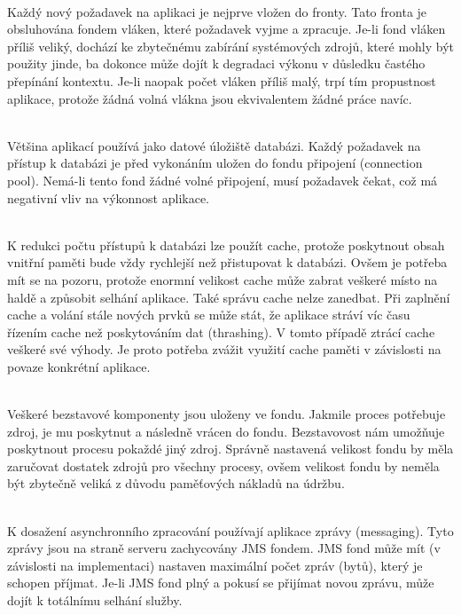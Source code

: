 \documentclass[122pt,oneside]{fithesis}
\begin{document}
\vspace{5 mm}
\\\indent Každý nový požadavek na aplikaci je nejprve vložen do fronty. Tato fronta je obsluhována fondem vláken, které požadavek vyjme a zpracuje. Je-li fond vláken příliš veliký, dochází ke zbytečnému zabírání systémových zdrojů, které mohly být použity jinde, ba dokonce může dojít k degradaci výkonu v důsledku častého přepínání kontextu. Je-li naopak počet vláken příliš malý, trpí tím propustnost aplikace, protože žádná volná vlákna jsou ekvivalentem žádné práce navíc.

\vspace{5 mm}
\\\indent Většina aplikací používá jako datové úložiště databázi. Každý požadavek na přístup k databázi je před vykonáním uložen do fondu připojení (connection pool). Nemá-li tento fond žádné volné připojení, musí požadavek čekat, což má negativní vliv na výkonnost aplikace.

\vspace{5 mm}
\\\indent K redukci počtu přístupů k databázi lze použít cache, protože poskytnout obsah vnitřní paměti bude vždy rychlejší než přistupovat k databázi. Ovšem je potřeba mít se na pozoru, protože enormní velikost cache může zabrat veškeré místo na haldě a způsobit selhání aplikace. Také správu cache nelze zanedbat. Při zaplnění cache a volání stále nových prvků se může stát, že aplikace stráví víc času řízením cache než poskytováním dat (thrashing). V tomto případě ztrácí cache veškeré své výhody. Je proto potřeba zvážit využití cache paměti v závislosti na povaze konkrétní aplikace. 

\vspace{5 mm}
\\\indent Veškeré bezstavové komponenty jsou uloženy ve fondu. Jakmile proces potřebuje zdroj, je mu poskytnut a následně vrácen do fondu. Bezstavovost nám umožňuje poskytnout procesu pokaždé jiný zdroj. Správně nastavená velikost fondu by měla zaručovat dostatek zdrojů pro všechny procesy, ovšem velikost fondu by neměla být zbytečně veliká z důvodu paměťových nákladů na údržbu.

\vspace{5 mm}
\\\indent K dosažení asynchronního zpracování používají aplikace zprávy (messaging). Tyto zprávy jsou na straně serveru zachycovány JMS fondem. JMS fond může mít (v závislosti na implementaci) nastaven maximální počet zpráv (bytů), který je schopen příjmat. Je-li JMS fond plný a pokusí se přijímat novou zprávu, může dojít k totálnímu selhání služby.
\end{document}
